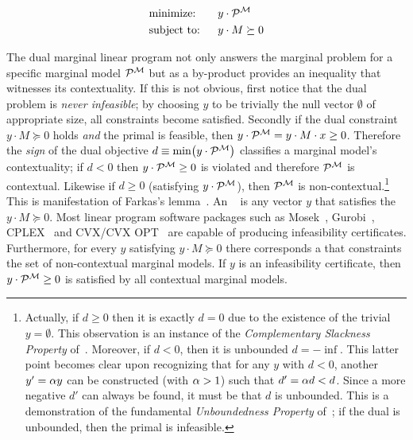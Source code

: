 \documentclass[aps, 10pt, english, twoside, pra, nofootinbib, tightenlines, longbibliography, superscriptaddress]{revtex4-1}
\begin{document}
    \begin{equation}
    \begin{aligned}
        & \text{minimize:} \quad&& y \cdot \probvec^{\mscenario}\\
        & \text{subject to:} && y \cdot M \succeq 0
    \end{aligned}
    \end{equation}

    The dual marginal linear program not only answers the marginal problem for a specific marginal model $\probvec^{\mscenario}$ but as a by-product provides an inequality that witnesses its contextuality. If this is not obvious, first notice that the dual problem is \textit{never infeasible}; by choosing $y$ to be trivially the null vector $\emptyset$ of appropriate size, all constraints become satisfied. Secondly if the dual constraint $y \cdot M \succeq 0$ holds \textit{and} the primal is feasible, then $y \cdot \probvec^{\mscenario} =  y \cdot M \cdot x \geq 0$. Therefore the \textit{sign} of the dual objective $d \defined \min \br{y \cdot \probvec^{\mscenario}}$ classifies a marginal model's contextuality; if $d < 0$ then $y \cdot \probvec^{\mscenario} \geq 0$ is violated and therefore $\probvec^{\mscenario}$ is contextual. Likewise if $d \geq 0$ (satisfying $y \cdot \probvec^{\mscenario}$), then $\probvec^{\mscenario}$ is non-contextual.\footnote{Actually, if $d \geq 0$ then it is exactly $d = 0$ due to the existence of the trivial $y = \emptyset$. This observation is an instance of the \textit{Complementary Slackness Property} of~\cite{Bradley_1977}. Moreover, if $d < 0$, then it is unbounded $d = -\inf$. This latter point becomes clear upon recognizing that for any $y$ with $d < 0$, another $y' = \alpha y$ can be constructed (with $\alpha > 1$) such that $d' = \alpha d < d$. Since a more negative $d'$ can always be found, it must be that $d$ is unbounded. This is a demonstration of the fundamental \textit{Unboundedness Property} of~\cite{Bradley_1977}; if the dual is unbounded, then the primal is infeasible.} This is manifestation of Farkas's lemma~\cite{Schrijver_1998}. An ~\cite{Andersen_2001} is any vector $y$ that satisfies the $y \cdot M \succeq 0$. Most linear program software packages such as Mosek~\cite{Mosek_2016}, Gurobi~\cite{Gurobi_2016}, CPLEX~\cite{Cplex_2016} and CVX/CVX OPT~\cite{CVX_2016,CVX_Opt_2016} are capable of producing infeasibility certificates. Furthermore, for every $y$ satisfying $y \cdot M \succeq 0$ there corresponds a  that constraints the set of non-contextual marginal models. If $y$ is an infeasibility certificate, then $y \cdot \probvec^{\mscenario} \geq 0$ is satisfied by all contextual marginal models.
\end{document}
